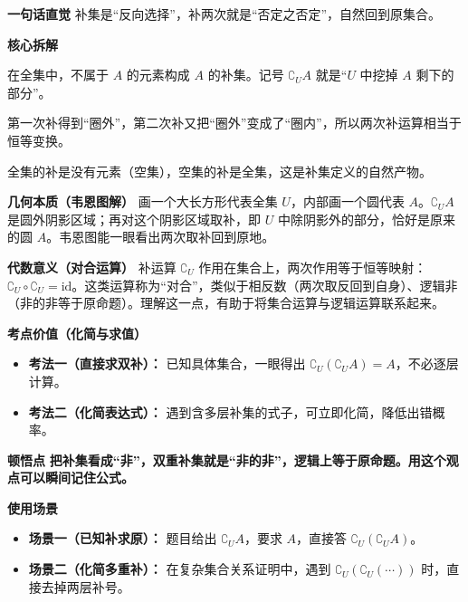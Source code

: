\begin{explanationbox}
	\textbf{\textcolor{CExplanation}{一句话直觉}}
	补集是“反向选择”，补两次就是“否定之否定”，自然回到原集合。

	\medskip
	\textbf{\textcolor{CExplanation}{核心拆解}}
	\begin{description}[style=nextline, leftmargin=2.8em, labelsep=0.5em, itemsep=0.45em]
		\item[\textbf{要点一（补集定义）：}] 在全集中，不属于 $A$ 的元素构成 $A$ 的补集。记号 $\complement_U A$ 就是“$U$ 中挖掉 $A$ 剩下的部分”。
		\item[\textbf{要点二（双补还原）：}] 第一次补得到“圈外”，第二次补又把“圈外”变成了“圈内”，所以两次补运算相当于恒等变换。
		\item[\textbf{要点三（边界特例）：}] 全集的补是没有元素（空集），空集的补是全集，这是补集定义的自然产物。
	\end{description}

	\medskip
	\textbf{\textcolor{CExplanation}{几何本质（韦恩图解）}}
	画一个大长方形代表全集 $U$，内部画一个圆代表 $A$。$\complement_U A$ 是圆外阴影区域；再对这个阴影区域取补，即 $U$ 中除阴影外的部分，恰好是原来的圆 $A$。韦恩图能一眼看出两次取补回到原地。

	\medskip
	\textbf{\textcolor{CExplanation}{代数意义（对合运算）}}
	补运算 $\complement_U$ 作用在集合上，两次作用等于恒等映射：$\complement_U \circ \complement_U = \text{id}$。这类运算称为“对合”，类似于相反数（两次取反回到自身）、逻辑非（非的非等于原命题）。理解这一点，有助于将集合运算与逻辑运算联系起来。

	\medskip
	\textbf{\textcolor{CExplanation}{考点价值（化简与求值）}}
	\begin{itemize}[leftmargin=*, itemsep=0.5em, topsep=0.4em]
		\item \textbf{考法一（直接求双补）：} 已知具体集合，一眼得出 $\complement_U(\complement_U A)=A$，不必逐层计算。
		\item \textbf{考法二（化简表达式）：} 遇到含多层补集的式子，可立即化简，降低出错概率。
	\end{itemize}

	\medskip
	\textbf{\textcolor{CExplanation}{顿悟点}}
	\textbf{把补集看成“非”，双重补集就是“非的非”，逻辑上等于原命题。用这个观点可以瞬间记住公式。}

	\medskip
	\textbf{\textcolor{CExplanation}{使用场景}}
	\begin{itemize}[leftmargin=*, itemsep=0.5em, topsep=0.4em]
		\item \textbf{场景一（已知补求原）：} 题目给出 $\complement_U A$，要求 $A$，直接答 $\complement_U(\complement_U A)$。
		\item \textbf{场景二（化简多重补）：} 在复杂集合关系证明中，遇到 $\complement_U(\complement_U(\cdots))$ 时，直接去掉两层补号。
	\end{itemize}
\end{explanationbox}
